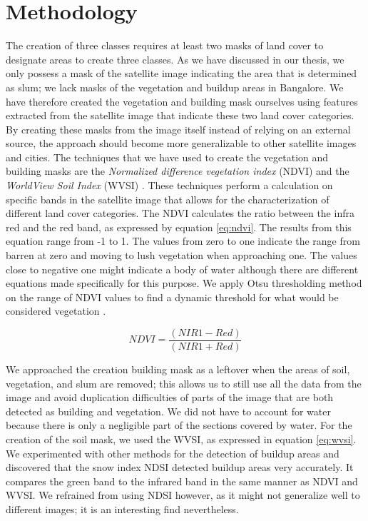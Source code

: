 \section{Methodology}
The creation of three classes requires at least two masks of land cover to designate areas to create three classes. As we have discussed in our thesis, we only possess a mask of the satellite image indicating the area that is determined as slum; we lack masks of the vegetation and buildup areas in Bangalore. We have therefore created the vegetation and building mask ourselves using features extracted from the satellite image that indicate these two land cover categories. By creating these masks from the image itself instead of relying on an external source, the approach should become more generalizable to other satellite images and cities. The techniques that we have used to create the vegetation and building masks are the \textit{Normalized difference vegetation index} (NDVI) and the \textit{WorldView Soil Index} (WVSI) \cite{ndvi} \cite{wvsi}. These techniques perform a calculation on specific bands in the satellite image that allows for the characterization of different land cover categories. The NDVI calculates the ratio between the infra red and the red band, as expressed by equation \ref{eq:ndvi}. The results from this equation range from -1 to 1. The values from zero to one indicate the range from barren at zero and moving to lush vegetation when approaching one. The values close to negative one might indicate a body of water although there are different equations made specifically for this purpose. We apply Otsu thresholding method on the range of NDVI values to find a dynamic threshold for what would be considered vegetation \cite{otsu1979threshold}.

\begin{equation}
\label{eq:ndvi}
NDVI = \frac{(NIR1 - Red)}{(NIR1 + Red)}
\end{equation}

We approached the creation building mask as a leftover when the areas of soil, vegetation, and slum are removed; this allows us to still use all the data from the image and avoid duplication difficulties of parts of the image that are both detected as building and vegetation. We did not have to account for water because there is only a negligible part of the sections covered by water. For the creation of the soil mask, we used the WVSI, as expressed in equation \ref{eq:wvsi}. We experimented with other methods for the detection of buildup areas and discovered that the snow index NDSI detected buildup areas very accurately. It compares the green band to the infrared band in the same manner as NDVI and WVSI. We refrained from using NDSI however, as it might not generalize well to different images; it is an interesting find nevertheless.


